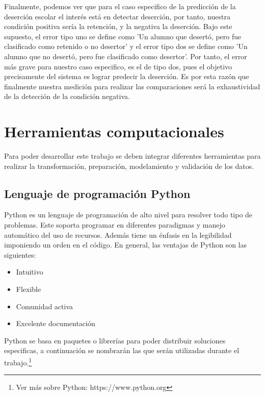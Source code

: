 Finalmente, podemos ver que para el caso especifico de la predicción de la deserción escolar el interés está en detectar deserción, por tanto, nuestra condición positiva sería la retención, y la negativa la deserción. Bajo este supuesto, el error tipo uno se define como 'Un alumno que desertó, pero fue clasificado como retenido o no desertor' y el error tipo dos se define como 'Un alumno que no desertó, pero fue clasificado como desertor'. Por tanto, el error más grave para nuestro caso especifico, es el de tipo dos, pues el objetivo precisamente del sistema es lograr predecir la deserción. Es por esta razón que finalmente nuestra medición para realizar las comparaciones será la exhaustividad de la detección de la condición negativa.\cite{powers2011evaluation}

\section{Herramientas computacionales}
Para poder desarrollar este trabajo se deben integrar diferentes herramientas para realizar la transformación, preparación, modelamiento y validación de los datos.
\subsection{Lenguaje de programación Python}
Python es un lenguaje de programación de alto nivel para resolver todo tipo de problemas. Este soporta programar en diferentes paradigmas y manejo automático del uso de recursos. Además tiene un énfasis en la legibilidad imponiendo un orden en el código.
En general, las ventajas de Python son las siguientes:
\begin{itemize}
  \item Intuitivo
  \item Flexible
  \item Comunidad activa
  \item Excelente documentación
\end{itemize}
Python se basa en paquetes o librerías para poder distribuir soluciones especificas, a continuación se nombrarán las que serán utilizadas durante el trabajo.\footnote{Ver más sobre Python: https://www.python.org}
